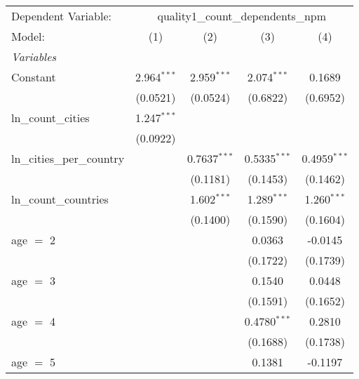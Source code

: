 \begingroup
\centering
\begin{tabular}{lcccc}
   \tabularnewline \midrule \midrule
   Dependent Variable: & \multicolumn{4}{c}{quality1\_count\_dependents\_npm}\\
   Model:                               & (1)           & (2)            & (3)            & (4)\\  
   \midrule
   \emph{Variables}\\
   Constant                             & 2.964$^{***}$ & 2.959$^{***}$  & 2.074$^{***}$  & 0.1689\\   
                                        & (0.0521)      & (0.0524)       & (0.6822)       & (0.6952)\\   
   ln\_count\_cities                    & 1.247$^{***}$ &                &                &   \\   
                                        & (0.0922)      &                &                &   \\   
   ln\_cities\_per\_country             &               & 0.7637$^{***}$ & 0.5335$^{***}$ & 0.4959$^{***}$\\   
                                        &               & (0.1181)       & (0.1453)       & (0.1462)\\   
   ln\_count\_countries                 &               & 1.602$^{***}$  & 1.289$^{***}$  & 1.260$^{***}$\\   
                                        &               & (0.1400)       & (0.1590)       & (0.1604)\\   
   age $=$ 2                            &               &                & 0.0363         & -0.0145\\   
                                        &               &                & (0.1722)       & (0.1739)\\   
   age $=$ 3                            &               &                & 0.1540         & 0.0448\\   
                                        &               &                & (0.1591)       & (0.1652)\\   
   age $=$ 4                            &               &                & 0.4780$^{***}$ & 0.2810\\   
                                        &               &                & (0.1688)       & (0.1738)\\   
   age $=$ 5                            &               &                & 0.1381         & -0.1197\\   

\end{tabular}

